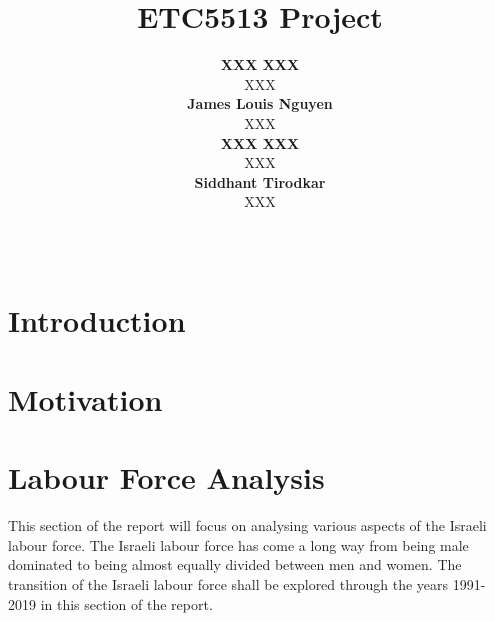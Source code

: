 \documentclass[11pt,a4paper,]{article}
\title{ETC5513 Project}
\author{\sf\Large\textbf{ XXX XXX}\\ {\sf\large XXX\\[0.5cm]} \sf\Large\textbf{ James Louis Nguyen}\\ {\sf\large XXX\\[0.5cm]} \sf\Large\textbf{ XXX XXX}\\ {\sf\large XXX\\[0.5cm]} \sf\Large\textbf{ Siddhant Tirodkar}\\ {\sf\large XXX\\[0.5cm]}}
\date{\sf\Date~\Month~\Year}
\makeatletter
\newenvironment{Shaded}{\begin{snugshade}}{\end{snugshade}}
\newcommand{\DecValTok}[1]{\textcolor[rgb]{0.00,0.00,0.81}{#1}}
\newcommand{\KeywordTok}[1]{\textcolor[rgb]{0.13,0.29,0.53}{\textbf{#1}}}
\newcommand{\NormalTok}[1]{#1}
\newcommand{\OperatorTok}[1]{\textcolor[rgb]{0.81,0.36,0.00}{\textbf{#1}}}
\newcommand{\StringTok}[1]{\textcolor[rgb]{0.31,0.60,0.02}{#1}}
\def\titlepage{\front{\expandafter{\@title}}{\@author}{\@organization}}
\makeatother
\begin{document}
\titlepage

\section*{Introduction}

\section*{Motivation}

\section*{}

\section*{}

\section*{}

\section*{Labour Force Analysis}

This section of the report will focus on analysing various aspects of the Israeli labour force. The Israeli labour force has come a long way from being male dominated to being almost equally divided between men and women. The transition of the Israeli labour force shall be explored through the years 1991-2019 in this section of the report.

\begin{Shaded}
\end{Shaded}
\end{document}
